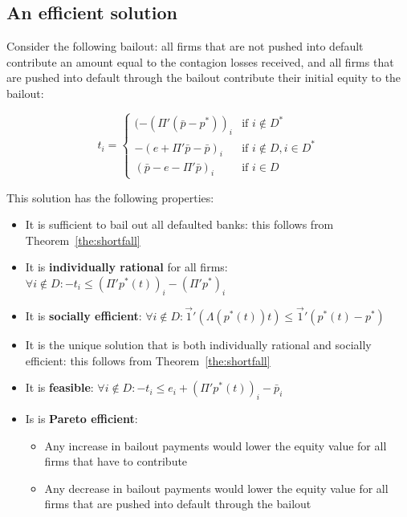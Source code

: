 \documentclass[12pt,a4paper]{article}
\begin{document}
\subsection{An efficient solution}

Consider the following bailout: all firms that are not pushed into default contribute an amount equal to the contagion losses received, and all firms that are pushed into default through the bailout contribute their initial equity to the bailout:

\[
t_i=
\begin{cases}
(-(\Pi' (\bar{p}-p^* ))_i  & \mbox{if } i \notin D^* \\
-(e+\Pi' \bar{p}-\bar{p})_i & \mbox{if } i \notin D,i \in D^* \\
(\bar{p}-e-\Pi' \bar{p})_i & \mbox{if } i \in D
\end{cases}
\]

This solution has the following properties:
\begin{itemize}
\item It is sufficient to bail out all defaulted banks: this follows from Theorem~\ref{the:shortfall}
\item It is \textbf{individually rational} for all firms: $\forall i \notin D \colon -t_i \le (\Pi' p^* (t))_i-(\Pi' p^* )_i$
\item It is \textbf{socially efficient}: $\forall i \notin D \colon \vec{1}' (\Lambda(p^* (t))t) \le \vec{1}' (p^* (t)-p^* )$
\item It is the unique solution that is both individually rational and socially efficient: this follows from Theorem~\ref{the:shortfall}
\item It is \textbf{feasible}: $\forall i \notin D \colon -t_i \le e_i+(\Pi' p^* (t))_i-\bar{p}_i$
\item Is is \textbf{Pareto efficient}:
\begin{itemize}
\item Any increase in bailout payments would lower the equity value for all firms that have to contribute
\item Any decrease in bailout payments would lower the equity value for all firms that are pushed into default through the bailout
\end{itemize}
\end{itemize}
\end{document}
